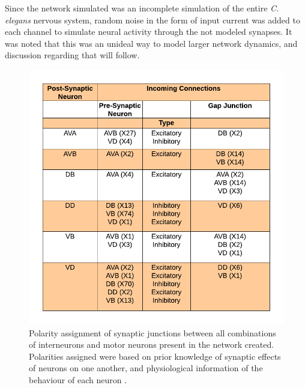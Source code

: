 \documentclass[11pt]{article} %
\begin{document}
Since the network simulated was an incomplete simulation of the entire \emph{C. elegans} nervous system, random noise in the form of input current was added to each channel to simulate neural activity through the not modeled synapses. It was noted that this was an unideal way to model larger network dynamics, and discussion regarding that will follow.
\begin{figure}[h!]
\begin{center}
\includegraphics[scale=0.63]{motn_fig3.png} \caption[h3]{Polarity assignment of synaptic junctions between all combinations of interneurons and motor neurons present in the network created. Polarities assigned were based on prior knowledge \cite{White1986, Chen2006} of synaptic effects of neurons on one another, and physiological information of the behaviour of each neuron \cite{Altun2003, Chalfie1985}.} \label{fig:f3} \end{center}
\begin{center}

\end{center}
\end{figure}
\end{document}
